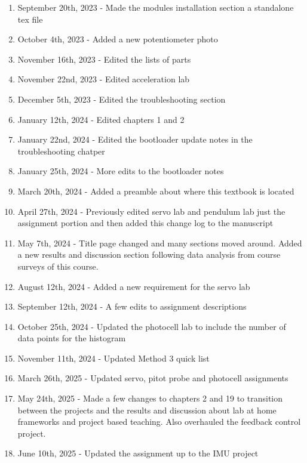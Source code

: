 \documentclass{article}
\begin{document}
\begin{enumerate}[itemsep=-5pt]
\item September 20th, 2023 - Made the modules installation section a standalone tex file
\item October 4th, 2023 - Added a new potentiometer photo
\item November 16th, 2023 - Edited the lists of parts 
\item November 22nd, 2023 - Edited acceleration lab
\item December 5th, 2023 - Edited the troubleshooting section
\item January 12th, 2024 - Edited chapters 1 and 2
\item January 22nd, 2024 - Edited the bootloader update notes in the troubleshooting chatper
\item January 25th, 2024 - More edits to the bootloader notes
\item March 20th, 2024 - Added a preamble about where this textbook is located
\item April 27th, 2024 - Previously edited servo lab and pendulum lab just the assignment portion and then added this change log to the manuscript
\item May 7th, 2024 - Title page changed and many sections moved around. Added a new results and discussion section following data analysis from course surveys of this course.
\item August 12th, 2024 - Added a new requirement for the servo lab
\item September 12th, 2024 - A few edits to assignment descriptions
\item October 25th, 2024 - Updated the photocell lab to include the number of data points for the histogram
\item November 11th, 2024 - Updated Method 3 quick list
\item March 26th, 2025 - Updated servo, pitot probe and photocell assignments
\item May 24th, 2025 - Made a few changes to chapters 2 and 19 to transition between the projects and the results and discussion about lab at home frameworks and project based teaching. Also overhauled the feedback control project. 
\item June 10th, 2025 - Updated the assignment up to the IMU project
\end{enumerate}

\newpage

\tableofcontents

\newpage













\end{document}
